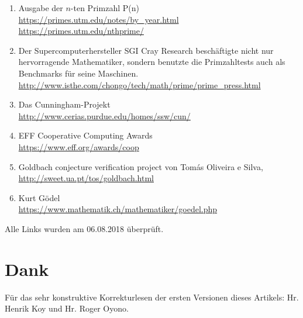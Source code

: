 \begin{refsegment}
\begin{enumerate}
\item Ausgabe der $n$-ten Primzahl P(n)\\
      \url{https://primes.utm.edu/notes/by_year.html}\\
      \url{https://primes.utm.edu/nthprime/}

\item Der Supercomputerhersteller SGI Cray Research beschäftigte nicht
      nur hervorragende Mathematiker, sondern benutzte die Primzahltests
      auch als Benchmarks für seine Maschinen.\\
      \url{http://www.isthe.com/chongo/tech/math/prime/prime_press.html}

\item Das Cunningham-Projekt\\
      \url{http://www.cerias.purdue.edu/homes/ssw/cun/}

\item EFF Cooperative Computing Awards\\
	\url{https://www.eff.org/awards/coop}

\item Goldbach conjecture verification project von Tomás Oliveira e Silva,
      \\
      \url{http://sweet.ua.pt/tos/goldbach.html}

\item Kurt Gödel\\
	\url{https://www.mathematik.ch/mathematiker/goedel.php}




\end{enumerate}

 Alle Links wurden am 06.08.2018 überprüft.



\section*{Dank} 
Für das sehr konstruktive Korrekturlesen der ersten Versionen
dieses Artikels: Hr. Henrik Koy und Hr. Roger Oyono.




\end{refsegment}
